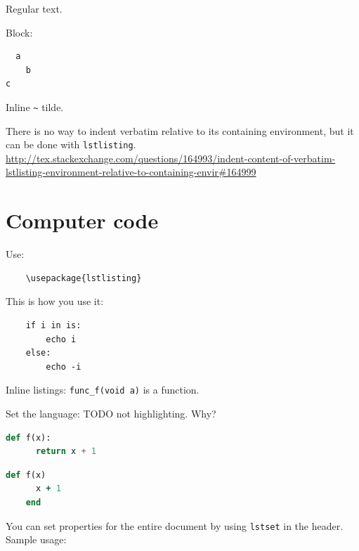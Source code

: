 \documentclass[12pt]{article}
\begin{document}
  Regular text.

  Block:

  \begin{verbatim}
  a
    b
c
  \end{verbatim}

  Inline \verb|~| tilde.

  There is no way to indent verbatim relative to its containing environment, but it can be done with \lstinline|lstlisting|.
  \url{http://tex.stackexchange.com/questions/164993/indent-content-of-verbatim-lstlisting-environment-relative-to-containing-envir#164999}

\section{Computer code}\label{computer-code}

  Use:

  \begin{lstlisting}
    \usepackage{lstlisting}
  \end{lstlisting}

  This is how you use it:

  \begin{lstlisting}
    if i in is:
        echo i
    else:
        echo -i
  \end{lstlisting}

  Inline listings: \lstinline|func_f(void a)| is a function.

  Set the language: TODO not highlighting. Why?

  \begin{lstlisting}[language=Python]
    def f(x):
      return x + 1
  \end{lstlisting}

  \begin{lstlisting}[language=Ruby]
    def f(x)
      x + 1
    end
  \end{lstlisting}

  You can set properties for the entire document by using \lstinline|lstset| in the header.
  Sample usage:
\end{document}
